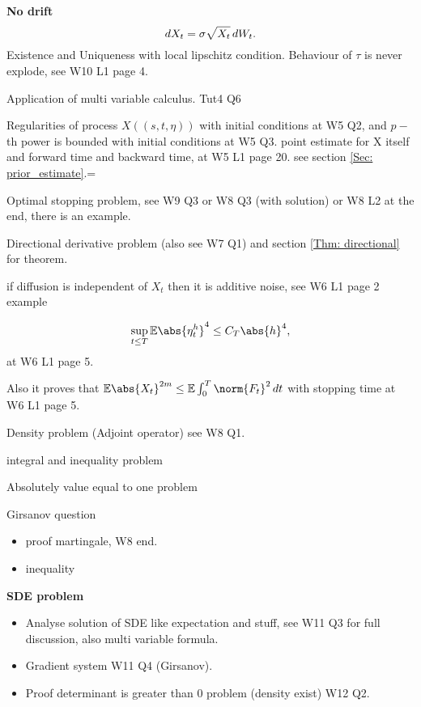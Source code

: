 \vspace{2cm}
\textbf{No drift}
\begin{equation*}
    \mathop{}\!d X_t = \sigma \sqrt{X_t} \mathop{}\!d W_t.
\end{equation*}
Existence and Uniqueness with local lipschitz condition. Behaviour of $\tau$ is never explode, see W10 L1 page 4.

\newpage 
Application of multi variable \ito calculus. Tut4 Q6

Regularities of process $X((s,t,\eta))$ with initial conditions at W5 Q2, and $p-$th power is bounded with initial conditions at W5 Q3.  point estimate for X itself and forward time and backward time, at W5 L1 page 20. see section \ref{Sec: prior_estimate}.=

Optimal stopping problem, see W9 Q3 or W8 Q3 (with solution) or W8 L2 at the end, there is an example.


Directional derivative problem (also see W7 Q1) and section \ref{Thm: directional} for theorem.
    
if diffusion is independent of $X_t$ then it is additive noise, see W6 L1 page 2 example

\begin{equation*}
    \sup_{t\leq T} \E\abs{\eta_t^h}^4 \leq C_T \abs{h}^4,
\end{equation*}
at W6 L1 page 5.

Also it proves that $\E\abs{X_t}^{2m} \leq \E\int_0^T \norm{F_t}^2 \diff t$ with stopping time at W6 L1 page 5.

Density problem (Adjoint operator) see W8 Q1.

\ito integral and inequality problem

Absolutely value equal to one problem 

Girsanov question 
\begin{itemize}
    \item proof martingale, W8 end.
    \item inequality
\end{itemize}
\vspace{2cm}
\textbf{SDE problem}
\begin{itemize}
    \item Analyse solution of SDE like expectation and stuff, see W11 Q3 for full discussion, also multi variable \ito formula.
    \item Gradient system W11 Q4 (Girsanov).
    \item Proof determinant is greater than 0 problem (density exist) W12 Q2.
\end{itemize}

